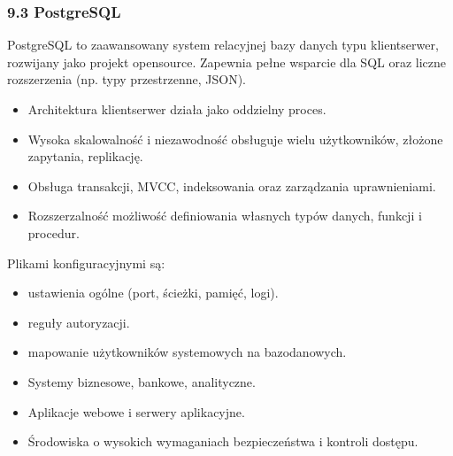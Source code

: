 \documentclass[letterpaper,10pt,polish]{sphinxmanual}
\begin{document}
\subsubsection{9.3 PostgreSQL}
\label{\detokenize{rozdzial2/Konfiguracja_baz_danych/Konfiguracja_baz_danych:postgresql}}
\sphinxAtStartPar
PostgreSQL to zaawansowany system relacyjnej bazy danych typu klient\sphinxhyphen{}serwer, rozwijany jako projekt open\sphinxhyphen{}source. Zapewnia pełne wsparcie dla SQL oraz liczne rozszerzenia (np. typy przestrzenne, JSON).

\sphinxAtStartPar
{}
\begin{itemize}
\item {} 
\sphinxAtStartPar
Architektura klient\sphinxhyphen{}serwer \textendash{} działa jako oddzielny proces.

\item {} 
\sphinxAtStartPar
Wysoka skalowalność i niezawodność \textendash{} obsługuje wielu użytkowników, złożone zapytania, replikację.

\item {} 
\sphinxAtStartPar
Obsługa transakcji, MVCC, indeksowania oraz zarządzania uprawnieniami.

\item {} 
\sphinxAtStartPar
Rozszerzalność \textendash{} możliwość definiowania własnych typów danych, funkcji i procedur.

\end{itemize}

\sphinxAtStartPar
{}
Plikami konfiguracyjnymi są:
\begin{itemize}
\item {} 
\sphinxAtStartPar
{} \textendash{} ustawienia ogólne (port, ścieżki, pamięć, logi).

\item {} 
\sphinxAtStartPar
{} \textendash{} reguły autoryzacji.

\item {} 
\sphinxAtStartPar
{} \textendash{} mapowanie użytkowników systemowych na bazodanowych.

\end{itemize}

\sphinxAtStartPar
{}
\begin{itemize}
\item {} 
\sphinxAtStartPar
Systemy biznesowe, bankowe, analityczne.

\item {} 
\sphinxAtStartPar
Aplikacje webowe i serwery aplikacyjne.

\item {} 
\sphinxAtStartPar
Środowiska o wysokich wymaganiach bezpieczeństwa i kontroli dostępu.

\end{itemize}
\end{document}

